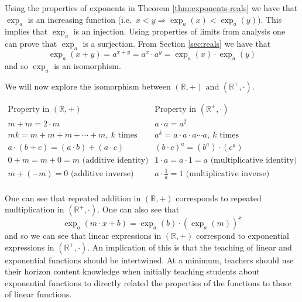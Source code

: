 \documentclass[
]{book}
\theoremstyle{definition}
\theoremstyle{definition}
\theoremstyle{definition}
\theoremstyle{definition}
\theoremstyle{remark}
\begin{document}
Using the properties of exponents in Theorem \ref{thm:exponents-reals} we have that \(\exp_a\) is an increasing function (i.e.~\(x<y \Rightarrow \exp_a{(x)}<\exp_a{(y)}\)). This implies that \(\exp_a\) is an injection. Using properties of limits from analysis one can prove that \(\exp_a\) is a surjection. From Section \ref{sec:reals} we have that \[\exp_a{(x+y)} = a^{x+y} = a^x \cdot a^y = \exp_a{(x)}\cdot \exp_a{(y)}\] and so \(\exp_a\) is an isomorphism.

We will now explore the isomorphism between \((\mathbb{R},+)\) and \((\mathbb{R}^+,\cdot)\).

\[\begin{array}{c|c}
\mbox{Property in } (\mathbb{R},+) & \mbox{Property in } (\mathbb{R}^+,\cdot) \\ \hline
 m+m=2\cdot m & a\cdot a = a^2 \\ 
mk=m+m+m+\cdots +m, \: k \mbox{ times} & a^k=a \cdot a \cdot a\cdots a, \: k \mbox{ times} \\ 
a\cdot (b+c) = (a\cdot b) + (a\cdot c) & (b\cdot c)^a = (b^a) \cdot (c^a) \\ 
0+m=m+0=m  \mbox{ (additive identity)} & 1\cdot a=a\cdot 1= a  \mbox{ (multiplicative identity)} \\ 
m+(-m)=0 \mbox{ (additive inverse)} & a\cdot \frac{1}{a}=1 \mbox{ (multiplicative inverse)} \\ 
\end{array}\]

One can see that repeated addition in \((\mathbb{R},+)\) corresponds to repeated multiplication in \((\mathbb{R}^+,\cdot)\). One can also see that \[\exp_a\left( m\cdot x + b\right) = \exp_a(b) \cdot \left(\exp_a(m)\right)^x\] and so we can see that linear expressions in \((\mathbb{R},+)\) correspond to exponential expressions in \((\mathbb{R}^+,\cdot)\). An implication of this is that the teaching of linear and exponential functions should be intertwined. At a minimum, teachers should use their horizon content knowledge when initially teaching students about exponential functions to directly related the properties of the functions to those of linear functions.
\end{document}
